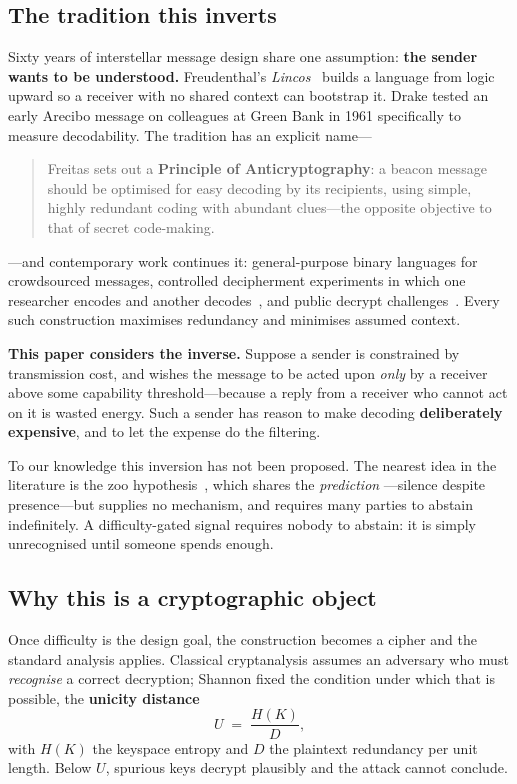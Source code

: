 \subsection{The tradition this inverts}\label{sec:tradition}

Sixty years of interstellar message design share one assumption: \textbf{the
sender wants to be understood.} Freudenthal's \emph{Lincos}~\cite{freudenthal}
builds a language from logic upward so a receiver with no shared context can
bootstrap it. Drake tested an early Arecibo message on colleagues at Green Bank
in 1961 specifically to measure decodability. The tradition has an explicit
name---

\begin{quote}
Freitas sets out a \textbf{Principle of Anticryptography}: a beacon message
should be optimised for easy decoding by its recipients, using simple, highly
redundant coding with abundant clues---the opposite objective to that of secret
code-making.~\cite{xenology}
\end{quote}

\noindent---and contemporary work continues it: general-purpose binary languages
for crowdsourced messages, controlled decipherment experiments in which one
researcher encodes and another decodes~\cite{busch}, and public decrypt
challenges~\cite{decrypt}. Every such construction maximises redundancy and
minimises assumed context.

\textbf{This paper considers the inverse.} Suppose a sender is constrained by
transmission cost, and wishes the message to be acted upon \emph{only} by a
receiver above some capability threshold---because a reply from a receiver who
cannot act on it is wasted energy. Such a sender has reason to make decoding
\textbf{deliberately expensive}, and to let the expense do the filtering.

To our knowledge this inversion has not been proposed. The nearest idea in the
literature is the zoo hypothesis~\cite{ball}, which shares the \emph{prediction}
---silence despite presence---but supplies no mechanism, and requires many
parties to abstain indefinitely. A difficulty-gated signal requires nobody to
abstain: it is simply unrecognised until someone spends enough.

\subsection{Why this is a cryptographic object}

Once difficulty is the design goal, the construction becomes a cipher and the
standard analysis applies. Classical cryptanalysis assumes an adversary who must
\emph{recognise} a correct decryption; Shannon fixed the condition under which
that is possible, the \textbf{unicity distance}~\cite{shannon}
\[
  U \;=\; \frac{H(K)}{D},
\]
with $H(K)$ the keyspace entropy and $D$ the plaintext redundancy per unit
length. Below $U$, spurious keys decrypt plausibly and the attack cannot
conclude.

